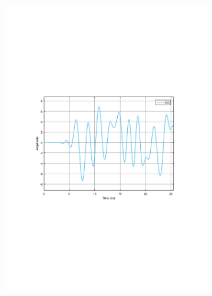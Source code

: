 \begin{refsection}
\begin{figure}[h!]
\centering
\begin{subfigure}{.5\textwidth}
  \centering
  \includegraphics[width=\linewidth]{./sdf/dsp_laser_phase_compensation/figures/S15_td.pdf}
  \caption{}
  \label{fig:sub1}
\end{subfigure}%
\begin{subfigure}{.5\textwidth}
  \centering

\end{subfigure}
\end{figure}
\end{refsection}
